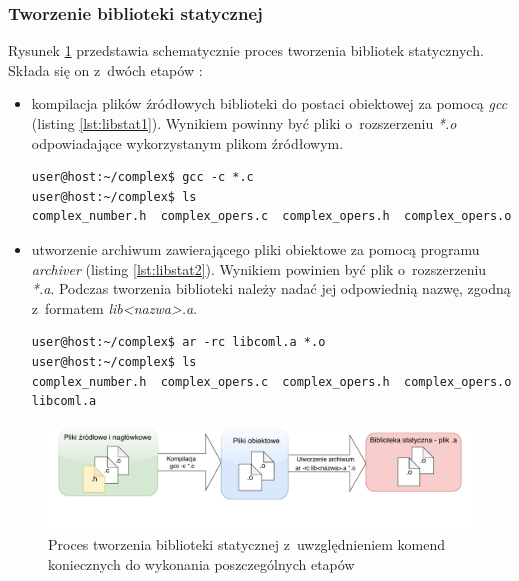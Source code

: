 \subsubsection*{Tworzenie biblioteki statycznej}
Rysunek \ref{fig:staticlibflow} przedstawia schematycznie proces tworzenia bibliotek statycznych. Składa się on z~dwóch etapów \cite{Static1}:
\begin{itemize}
\item kompilacja plików źródłowych biblioteki do postaci obiektowej za pomocą \textit{gcc} (listing \ref{lst:libstat1}). Wynikiem powinny być pliki o~rozszerzeniu \textit{*.o} odpowiadające wykorzystanym plikom źródłowym.

\begin{lstlisting}[language=Cmd, caption={Kompilacja plików źródłowych biblioteki do postaci obiektowej - polecenie oraz jego wynik},label={lst:libstat1}]
user@host:~/complex$ gcc -c *.c
user@host:~/complex$ ls
complex_number.h  complex_opers.c  complex_opers.h  complex_opers.o
\end{lstlisting}


\item utworzenie archiwum zawierającego pliki obiektowe za pomocą programu \textit{archiver} (listing \ref{lst:libstat2}). Wynikiem powinien być plik o~rozszerzeniu \textit{*.a}. Podczas tworzenia biblioteki należy nadać jej odpowiednią nazwę, zgodną z~formatem \textit{lib<nazwa>.a}.

\begin{lstlisting}[language=Cmd, caption={Utworzenie biblioteki statycznej z~plików obiektowych - polecenie oraz jego wynik},label={lst:libstat2}]
user@host:~/complex$ ar -rc libcoml.a *.o
user@host:~/complex$ ls
complex_number.h  complex_opers.c  complex_opers.h  complex_opers.o  libcoml.a
\end{lstlisting}

\end{itemize}

\begin{figure}[H]
\centering
\caption{Proces tworzenia biblioteki statycznej z~uwzględnieniem komend koniecznych do wykonania poszczególnych etapów \cite{Compiling}}
\label{fig:staticlibflow}
\includegraphics[width=\textwidth]{res/StaticLibFlow}
\end{figure}

